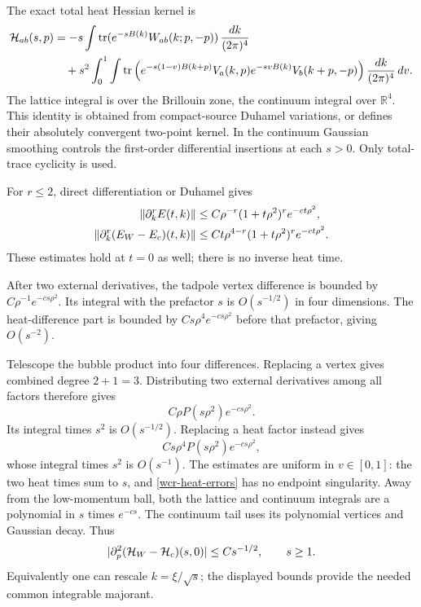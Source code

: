 The exact total heat Hessian kernel is
\begin{align}
 {\cal H}_{ab}(s,p)
 &=-s\int\operatorname{tr}
       (e^{-sB(k)}W_{ab}(k;p,-p))\,\frac{dk}{(2\pi)^4}
       \notag\\
 &\quad+s^2\int_0^1\int\operatorname{tr}
 \left(e^{-s(1-v)B(k+p)}V_a(k,p)
       e^{-svB(k)}V_b(k+p,-p)\right)
                         \frac{dk}{(2\pi)^4}\,dv.
 \label{wcr-diagram}
\end{align}
The lattice integral is over the Brillouin zone, the continuum integral
over \(\mathbb R^4\). This identity is obtained from compact-source
Duhamel variations, or defines their absolutely convergent two-point
kernel. In the continuum Gaussian smoothing controls the first-order
differential insertions at each \(s>0\). Only total-trace cyclicity is
used.

For \(r\le2\), direct differentiation or Duhamel gives
\begin{align}
 \|\partial_k^rE(t,k)\|
   &\le C\rho^{-r}(1+t\rho^2)^r e^{-ct\rho^2},\notag\\
 \|\partial_k^r(E_W-E_c)(t,k)\|
   &\le Ct\rho^{4-r}(1+t\rho^2)^r e^{-ct\rho^2}.
 \label{wcr-heat-errors}
\end{align}
These estimates hold at \(t=0\) as well; there is no inverse heat time.

After two external derivatives, the tadpole vertex difference is bounded
by \(C\rho^{-1}e^{-cs\rho^2}\). Its integral with the prefactor \(s\)
is \(O(s^{-1/2})\) in four dimensions.
The heat-difference part is bounded by \(Cs\rho^4e^{-cs\rho^2}\)
before that prefactor, giving \(O(s^{-2})\).

Telescope the bubble product into four differences.
Replacing a vertex gives combined degree \(2+1=3\). Distributing
two external derivatives among all factors therefore gives
\[
 C\rho P(s\rho^2)e^{-cs\rho^2}.
\]
Its integral times \(s^2\) is \(O(s^{-1/2})\).
Replacing a heat factor instead gives
\[
 Cs\rho^4P(s\rho^2)e^{-cs\rho^2},
\]
whose integral times \(s^2\) is \(O(s^{-1})\).
The estimates are uniform in \(v\in[0,1]\): the two heat times sum to
\(s\), and \eqref{wcr-heat-errors} has no endpoint singularity.
Away from the low-momentum ball, both the lattice and continuum
integrals are a polynomial in \(s\) times \(e^{-cs}\).
The continuum tail uses its polynomial vertices and Gaussian decay.
Thus
\begin{equation}
 |\partial_p^2({\cal H}_{W}-{\cal H}_{c})(s,0)|
       \le Cs^{-1/2},\qquad s\ge1.
 \label{wcr-kernel-bound}
\end{equation}
Equivalently one can rescale \(k=\xi/\sqrt{s}\);
the displayed bounds provide the needed common integrable majorant.

